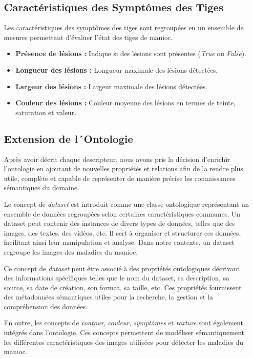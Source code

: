\subsection*{Caractéristiques des Symptômes des Tiges}

Les caractéristiques des symptômes des tiges sont regroupées en un ensemble de mesures permettant d'évaluer l'état des tiges de manioc.

\begin{itemize}
	\item \textbf{Présence de lésions :} Indique si des lésions sont présentes (\textit{True} ou \textit{False}).
	\item \textbf{Longueur des lésions :} Longueur maximale des lésions détectées.
	\item \textbf{Largeur des lésions :} Largeur maximale des lésions détectées.
	\item \textbf{Couleur des lésions :} Couleur moyenne des lésions en termes de teinte, saturation et valeur.
\end{itemize}

\subsection{Extension de l´Ontologie}

Après avoir décrit chaque descripteur, nous avons pris la décision d'enrichir l'ontologie en ajoutant de nouvelles propriétés et relations afin de la rendre plus utile, complète et capable de représenter de manière précise les connaissances sémantiques du domaine.

Le concept de \textit{dataset} est introduit comme une classe ontologique représentant un ensemble de données regroupées selon certaines caractéristiques communes. Un dataset peut contenir des instances de divers types de données, telles que des images, des textes, des vidéos, etc. Il sert à organiser et structurer ces données, facilitant ainsi leur manipulation et analyse. Dans notre contexte, un dataset regroupe les images des maladies du manioc.

Ce concept de \textit{dataset} peut être associé à des propriétés ontologiques décrivant des informations spécifiques telles que le nom du dataset, sa description, sa source, sa date de création, son format, sa taille, etc. Ces propriétés fournissent des métadonnées sémantiques utiles pour la recherche, la gestion et la compréhension des données.

En outre, les concepts de \textit{contour}, \textit{couleur}, \textit{symptômes} et \textit{texture} sont également intégrés dans l'ontologie. Ces concepts permettent de modéliser sémantiquement les différentes caractéristiques des images utilisées pour détecter les maladies du manioc.

